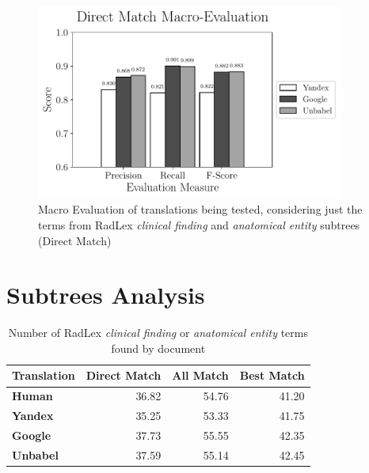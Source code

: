 \begin{figure}[ht]
	\centering
	\includegraphics[width=0.9\textwidth]{SupportFiles/plots/direct_match_macro_clinical_anatomical_subtrees_plot.pdf}
	\caption{Macro Evaluation of translations being tested, considering just the terms from RadLex \textit{clinical finding} and \textit{anatomical entity} subtrees (Direct Match)}
	\label{app:macro_eval_subtrees_direct}
\end{figure}



\chapter{Subtrees Analysis}
\begin{table}[ht]
	\centering
	\caption{Number of RadLex \textit{clinical finding} or \textit{anatomical entity} terms found by document}
	\begin{tabular}{lrrr}
		\toprule
		\textbf{Translation}   &   \textbf{Direct Match} &   \textbf{All Match} &   \textbf{Best Match} \\
		\midrule
		\textbf{Human}         &         36.82	  &  54.76	 &    41.20 \\
		\textbf{Yandex}        &         35.25	  &  53.33	  &   41.75 \\
		\textbf{Google}        &         37.73	  &  55.55	  &   42.35 \\
		\textbf{Unbabel}       &         37.59	 &   55.14	 &    42.45 \\
		\bottomrule
	\end{tabular} 
	\label{app:terms_by_document_subtrees}
\end{table}

